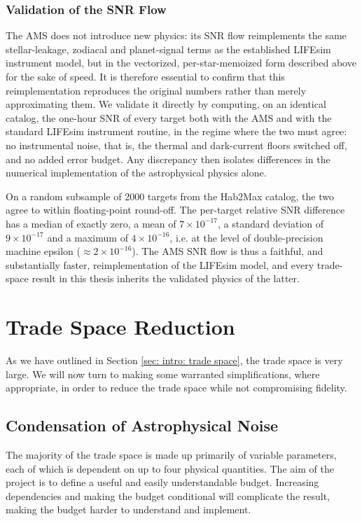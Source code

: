\documentclass[12pt,a4paper]{article}
\numberwithin{equation}{section}
\numberwithin{figure}{section}
\numberwithin{table}{section}
\begin{document}
\subsubsection{Validation of the SNR Flow}
The AMS does not introduce new physics: its SNR flow reimplements the same stellar-leakage, zodiacal and planet-signal terms as the established LIFEsim instrument model, but in the vectorized, per-star-memoized form described above for the sake of speed. It is therefore essential to confirm that this reimplementation reproduces the original numbers rather than merely approximating them. We validate it directly by computing, on an identical catalog, the one-hour SNR of every target both with the AMS and with the standard LIFEsim instrument routine, in the regime where the two must agree: no instrumental noise, that is, the thermal and dark-current floors switched off, and no added error budget. Any discrepancy then isolates differences in the numerical implementation of the astrophysical physics alone.

On a random subsample of 2000 targets from the Hab2Max catalog, the two agree to within floating-point round-off. The per-target relative SNR difference has a median of exactly zero, a mean of $7\times10^{-17}$, a standard deviation of $9\times10^{-17}$ and a maximum of $4\times10^{-16}$, i.e. at the level of double-precision machine epsilon ($\approx 2\times10^{-16}$). The AMS SNR flow is thus a faithful, and substantially faster, reimplementation of the LIFEsim model, and every trade-space result in this thesis inherits the validated physics of the latter.

\newpage

\section{Trade Space Reduction} \label{sec: ts reduction}
As we have outlined in Section \ref{sec: intro: trade space}, the trade space is very large. We will now turn to making some warranted simplifications, where appropriate, in order to reduce the trade space while not compromising fidelity.

\subsection{Condensation of Astrophysical Noise} \label{sec: ts reduction: condensation}
The majority of the trade space is made up primarily of variable parameters, each of which is dependent on up to four physical quantities. The aim of the project is to define a useful and easily understandable budget. Increasing dependencies and making the budget conditional will complicate the result, making the budget harder to understand and implement.
\end{document}
